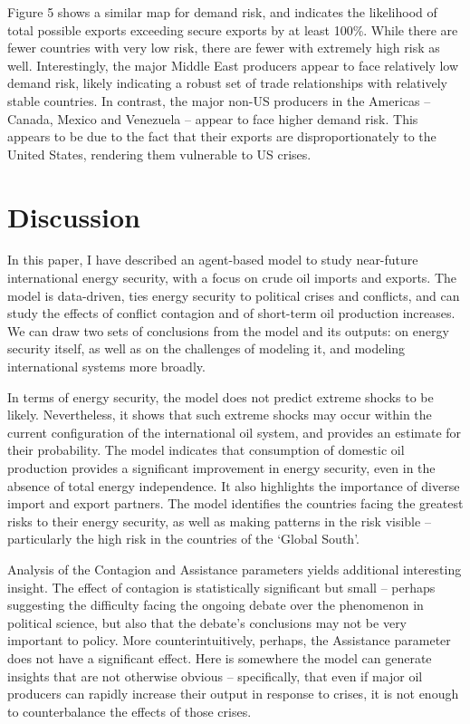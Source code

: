 \documentclass{llncs}
\begin{document}
Figure 5 shows a similar map for demand risk, and indicates the likelihood of total possible exports exceeding secure exports by at least 100\%. While there are fewer countries with very low risk, there are fewer with extremely high risk as well. Interestingly, the major Middle East producers appear to face relatively low demand risk, likely indicating a robust set of trade relationships with relatively stable countries. In contrast, the major non-US producers in the Americas -- Canada, Mexico and Venezuela -- appear to face higher demand risk. This appears to be due to the fact that their exports are disproportionately to the United States, rendering them vulnerable to US crises.


\section{Discussion}

In this paper, I have described an agent-based model to study near-future international energy security, with a focus on crude oil imports and exports. The model is data-driven, ties energy security to political crises and conflicts, and can study the effects of conflict contagion and of short-term oil production increases. We can draw two sets of conclusions from the model and its outputs: on energy security itself, as well as on the challenges of modeling it, and modeling international systems more broadly.

In terms of energy security, the model does not predict extreme shocks to be likely. Nevertheless, it shows that such extreme shocks may occur within the current configuration of the international oil system, and provides an estimate for their probability. The model indicates that consumption of domestic oil production provides a significant improvement in energy security, even in the absence of total energy independence. It also highlights the importance of diverse import and export partners. The model identifies the countries facing the greatest risks to their energy security, as well as making patterns in the risk visible -- particularly the high risk in the countries of the `Global South'. 

Analysis of the Contagion and Assistance parameters yields additional interesting insight. The effect of contagion is statistically significant but small -- perhaps suggesting the difficulty facing the ongoing debate over the phenomenon in political science, but also that the debate's conclusions may not be very important to policy. More counterintuitively, perhaps, the Assistance parameter does not have a significant effect. Here is somewhere the model can generate insights that are not otherwise obvious -- specifically, that even if major oil producers can rapidly increase their output in response to crises, it is not enough to counterbalance the effects of those crises. 
\end{document}

